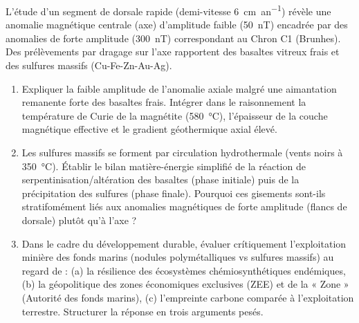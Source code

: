 \documentclass[11pt]{article}
\begin{document}
\begin{exercice}
L'étude d'un segment de dorsale rapide (demi-vitesse \SI{6}{cm.an^{-1}}) révèle une anomalie magnétique centrale (axe) d'amplitude faible (\SI{50}{nT}) encadrée par des anomalies de forte amplitude (\SI{300}{nT}) correspondant au Chron C1 (Brunhes). Des prélèvements par dragage sur l'axe rapportent des basaltes vitreux frais et des sulfures massifs (Cu-Fe-Zn-Au-Ag).

\begin{enumerate}
    \item Expliquer la faible amplitude de l'anomalie axiale malgré une aimantation remanente forte des basaltes frais. Intégrer dans le raisonnement la température de Curie de la magnétite (\SI{580}{\celsius}), l'épaisseur de la couche magnétique effective et le gradient géothermique axial élevé.
    \item Les sulfures massifs se forment par circulation hydrothermale (vents noirs à \SI{350}{\celsius}). Établir le bilan matière-énergie simplifié de la réaction de serpentinisation/altération des basaltes (phase initiale) puis de la précipitation des sulfures (phase finale). Pourquoi ces gisements sont-ils stratifomément liés aux anomalies magnétiques de forte amplitude (flancs de dorsale) plutôt qu'à l'axe ?
    \item Dans le cadre du développement durable, évaluer crítiquement l'exploitation minière des fonds marins (nodules polymétalliques vs sulfures massifs) au regard de : (a) la résilience des écosystèmes chémiosynthétiques endémiques, (b) la géopolitique des zones économiques exclusives (ZEE) et de la « Zone » (Autorité des fonds marins), (c) l'empreinte carbone comparée à l'exploitation terrestre. Structurer la réponse en trois arguments pesés.
\end{enumerate}
\end{exercice}
\end{document}
